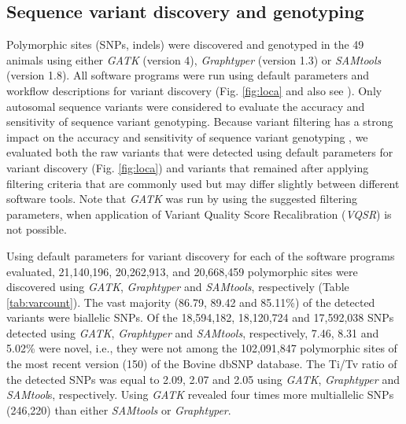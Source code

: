 \documentclass[../main.tex]{subfiles}
\begin{document}
\subsection*{Sequence variant discovery and genotyping}

Polymorphic  sites  (SNPs,  indels)  were  discovered  and  genotyped in the 49 animals using either \emph{GATK} (version 4), \emph{Graphtyper} (version  1.3)  or  \emph{SAMtools} (version  1.8). All software programs were run using default parameters and  workflow  descriptions  for  variant  discovery  (Fig. \ref{fig:loca} and  also  see ). Only autosomal sequence variants were considered  to  evaluate  the  accuracy  and  sensitivity  of sequence  variant genotyping. Because variant filtering has a strong impact on the accuracy and sensitivity of sequence variant genotyping \citep{carson2014effective,jun2015efficient}, we evaluated both  the  raw  variants  that  were  detected  using  default  parameters  for  variant  discovery  (Fig. \ref{fig:loca})  and  variants  that  remained  after  applying  filtering  criteria  that  are  commonly  used  but  may  differ  slightly  between  different software tools. Note that \emph{GATK} was run by using the suggested filtering parameters, when application of Variant Quality Score Recalibration (\emph{VQSR}) is not possible.

Using default parameters for variant discovery for each of the software programs evaluated, 21,140,196, 20,262,913, and 20,668,459 polymorphic sites were discovered using \emph{GATK}, \emph{Graphtyper} and \emph{SAMtools}, respectively (Table \ref{tab:varcount}). The vast majority (86.79, 89.42 and 85.11\%) of the detected variants were biallelic SNPs. Of the 18,594,182, 18,120,724 and 17,592,038 SNPs detected using \emph{GATK},  \emph{Graphtyper} and \emph{SAMtools}, respectively, 7.46, 8.31 and 5.02\% were novel, i.e., they were not among the 102,091,847 polymorphic sites of the most recent version (150) of the Bovine dbSNP database. The Ti/Tv ratio of the detected SNPs was equal to 2.09, 2.07 and 2.05 using \emph{GATK}, \emph{Graphtyper} and \emph{SAMtool}s, respectively. Using \emph{GATK} revealed four times more multiallelic SNPs (246,220) than either \emph{SAMtools} or \emph{Graphtyper}.
\end{document}
